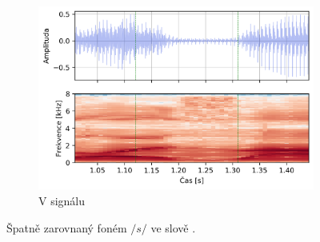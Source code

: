 \begin{figure}[htpb]
\begin{subfigure}[b]{0.65\textwidth}
    \includegraphics[width=\textwidth]{./ch6-realisation/img/energy_spec_word-segment.png}
    \caption{V signálu}
    \label{fig:realisation:augmentation:alignemnt:wrong:audio}
  \end{subfigure}
  \caption{Špatně zarovnaný foném $/s/$ ve slově .}
  \label{fig:realisation:augmentation:alignemnt:wrong}
\end{figure}






